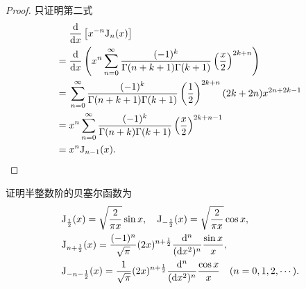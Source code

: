 \begin{proof}
  只证明第二式
  \begin{align*}
        & \frac{\mathop{}\!\mathrm{d}}{\mathop{}\!\mathrm{d} x}\left[x^{-n}\mathrm{J}_n(x)\right]\\
    ={} & \frac{\mathop{}\!\mathrm{d}}{\mathop{}\!\mathrm{d} x}\left(x^n\sum_{n=0}^{\infty}\frac{(-1)^k}{\Gamma(n+k+1)\Gamma(k+1)}\left(\frac{x}{2}\right)^{2k+n}\right)\\
    ={} & \sum_{n=0}^{\infty}\frac{(-1)^k}{\Gamma(n+k+1)\Gamma(k+1)}\left(\frac{1}{2}\right)^{2k+n}(2k+2n)x^{2n+2k-1}\\
    ={} & x^n\sum_{n=0}^{\infty}\frac{(-1)^k}{\Gamma(n+k)\Gamma(k+1)}\left(\frac{x}{2}\right)^{2k+n-1}\\
    ={} & x^n\mathrm{J}_{n-1}(x). \qedhere
  \end{align*}
\end{proof}



\begin{exercise}
  证明半整数阶的贝塞尔函数为
  \begin{align*}
    &\mathrm{J}_{\frac{1}{2}}(x)=\sqrt{\frac{2}{\pi x}}\sin x,
      \quad\mathrm{J}_{-\frac{1}{2}}(x)=\sqrt{\frac{2}{\pi x}}\cos x, \\
    &\mathrm{J}_{n+\frac{1}{2}}(x)=\frac{(-1)^n}{\sqrt{\pi}}(2x)^{n+\frac{1}{2}}\frac{\mathop{}\!\mathrm{d}^n}{(\mathop{}\!\mathrm{d} x^2)^n}\frac{\sin x}{x}, \\
    &\mathrm{J}_{-n-\frac{1}{2}}(x)=\frac{1}{\sqrt{\pi}}(2x)^{n+\frac{1}{2}}\frac{\mathop{}\!\mathrm{d}^n}{(\mathop{}\!\mathrm{d} x^2)^n}\frac{\cos x}{x}\quad (n=0,1,2,\cdots).
  \end{align*}
\end{exercise}


